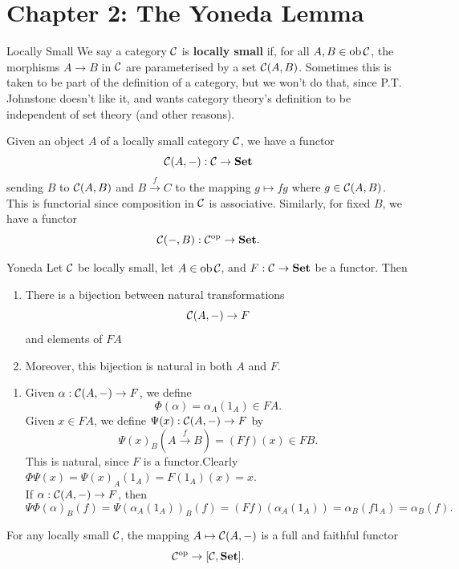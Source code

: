 \documentclass{article}
\begin{document}
\section{Chapter 2: The Yoneda Lemma}
\begin{fancydefine}{Locally Small}
    We say a category $\mathcal{C}$ is \textbf{locally small} if, for all $A, B \in \operatorname{ob} \mathcal{C}$, the morphisms $A \to B$ in $\mathcal{C}$ are parameterised by a set $\mathcal{C}(A,B)$. Sometimes this is taken to be part of the definition of a category, but we won't do that, since P.T. Johnstone doesn't like it, and wants category theory's definition to be independent of set theory (and other reasons).
\end{fancydefine}
Given an object $A$ of a locally small category $\mathcal{C}$, we have a functor \[ \mathcal{C}(A, - ) : \mathcal{C} \to \textbf{Set}\] sending $B$ to $\mathcal{C}(A,B)$ and $B \xrightarrow f C$ to the mapping $g \mapsto fg$ where $g \in \mathcal{C}(A,B)$. This is functorial since composition in $\mathcal{C}$ is associative. Similarly, for fixed $B$, we have a functor \[ \mathcal{C}( - , B): \mathcal{C}^{\text{op}} \to \textbf{Set}.\] 
\begin{fancylem}{Yoneda}
     Let $\mathcal{C}$ be locally small, let $A \in \operatorname{ob} \mathcal{C}$, and $F: \mathcal{C} \to \textbf{Set}$ be a functor. Then \begin{enumerate}
    \item[(i)] There is a bijection between natural transformations \[ \mathcal{C}(A, - ) \to F \] and elements of $FA$
    \item[(ii)] Moreover, this bijection is natural in both $A$ and $F$. 
\end{enumerate}
\end{fancylem}
\proof \hspace{0.1cm} \begin{enumerate}
    \item[(i)] Given $\alpha : \mathcal{C}(A, - ) \to F$, we define \[\Phi(\alpha) = \alpha_{A}(1_{A}) \in FA. \] Given $x \in FA$, we define $\Psi(x) : \mathcal{C}(A, - ) \to F$ by \[ \Psi(x)_{B}(A \xrightarrow f B) = (Ff)(x) \in FB.\] This is natural, since $F$ is a functor.\gap Clearly $\Phi \Psi (x) = \Psi(x)_{A}(1_{A}) = F(1_{A})(x) = x$.\\ If $\alpha: \mathcal{C}(A, - ) \to F$, then \[\Psi \Phi(\alpha)_{B}(f) = \Psi(\alpha_{A}(1_{A}))_{B}(f) = (Ff)(\alpha_{A}(1_{A})) = \alpha_{B}(f 1_{A}) = \alpha_{B}(f).\]
\end{enumerate}
\endproof
{} For any locally small $\mathcal{C}$, the mapping $A \mapsto \mathcal{C}(A, - )$ is a full and faithful functor \[ \mathcal{C}^{\text{op}} \to [\mathcal{C}, \textbf{Set}].\]
\end{document}
